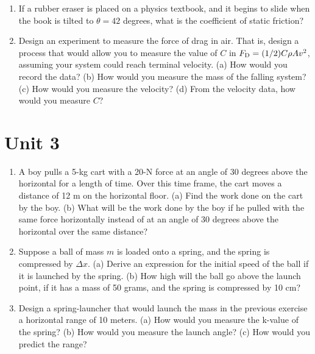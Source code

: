 \documentclass{article}
\begin{document}
\begin{enumerate}
\item If a rubber eraser is placed on a physics textbook, and it begins to slide when the book is tilted to $\theta = 42$ degrees, what is the coefficient of static friction? \\ \vspace{2cm}

\item Design an experiment to measure the force of drag in air.  That is, design a process that would allow you to measure the value of $C$ in $F_{\rm D} = (1/2) C \rho A v^2$, assuming your system could reach terminal velocity.  (a) How would you record the data? (b) How would you measure the mass of the falling system?  (c) How would you measure the velocity?  (d) From the velocity data, how would you measure $C$? \\ \vspace{4cm}

\end{enumerate}

\section{Unit 3}

\begin{enumerate}
\item A boy pulls a 5-kg cart with a 20-N force at an angle of 30 degrees above the horizontal for a length of time. Over this time frame, the cart moves a distance of 12 m on the horizontal floor. (a) Find the work done on the cart by the boy. (b) What will be the work done by the boy if he pulled with the same force horizontally instead of at an angle of 30 degrees above the horizontal over the same distance? \\ \vspace{3cm}
\item Suppose a ball of mass $m$ is loaded onto a spring, and the spring is compressed by $\Delta x$. (a) Derive an expression for the initial speed of the ball if it is launched by the spring. (b) How high will the ball go above the launch point, if it has a mass of 50 grams, and the spring is compressed by 10 cm? \\ \vspace{3cm}
\item Design a spring-launcher that would launch the mass in the previous exercise a horizontal range of 10 meters. (a) How would you measure the k-value of the spring?  (b) How would you measure the launch angle? (c) How would you predict the range?
\end{enumerate}
\end{document}
